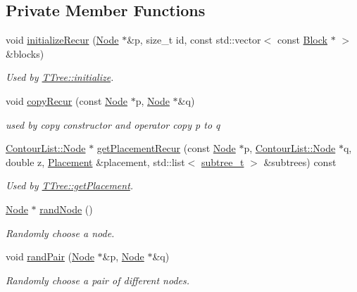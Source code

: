 \subsection*{Private Member Functions}
\begin{DoxyCompactItemize}
\item 
void \hyperlink{classTTree_aa4a9d2b247a7f9c33d1834fd23de7cca}{initialize\+Recur} (\hyperlink{classTTree_1_1Node}{Node} $\ast$\&p, size\+\_\+t id, const std\+::vector$<$ const \hyperlink{structBlock}{Block} $\ast$ $>$ \&blocks)
\begin{DoxyCompactList}\small\item\em Used by \hyperlink{classTTree_a7be152bf003a3b7a41a0d2f2b8a60dcb}{T\+Tree\+::initialize}. \end{DoxyCompactList}\item 
void \hyperlink{classTTree_a54e9506716179e9d2a607ebef51e485f}{copy\+Recur} (const \hyperlink{classTTree_1_1Node}{Node} $\ast$p, \hyperlink{classTTree_1_1Node}{Node} $\ast$\&q)
\begin{DoxyCompactList}\small\item\em used by copy constructor and operator copy p to q \end{DoxyCompactList}\item 
\hyperlink{structContourList_1_1Node}{Contour\+List\+::\+Node} $\ast$ \hyperlink{classTTree_a99a5f5452d13f1a3e4b74f8275224beb}{get\+Placement\+Recur} (const \hyperlink{classTTree_1_1Node}{Node} $\ast$p, \hyperlink{structContourList_1_1Node}{Contour\+List\+::\+Node} $\ast$q, double z, \hyperlink{classPlacement}{Placement} \&placement, std\+::list$<$ \hyperlink{structTTree_1_1subtree__t}{subtree\+\_\+t} $>$ \&subtrees) const 
\begin{DoxyCompactList}\small\item\em Used by \hyperlink{classTTree_a7e34e70567be7961d4a5683010746aae}{T\+Tree\+::get\+Placement}. \end{DoxyCompactList}\item 
\hyperlink{classTTree_1_1Node}{Node} $\ast$ \hyperlink{classTTree_acd9ed57c09bb59a5fcf618b8e215d584}{rand\+Node} ()
\begin{DoxyCompactList}\small\item\em Randomly choose a node. \end{DoxyCompactList}\item 
void \hyperlink{classTTree_aa756d0b900bc757b8095993d86fa5bd9}{rand\+Pair} (\hyperlink{classTTree_1_1Node}{Node} $\ast$\&p, \hyperlink{classTTree_1_1Node}{Node} $\ast$\&q)
\begin{DoxyCompactList}\small\item\em Randomly choose a pair of different nodes. \end{DoxyCompactList}\item 

\end{DoxyCompactItemize}
